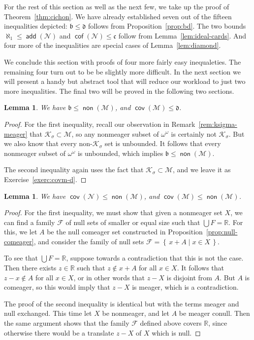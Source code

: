 \documentclass[11pt,oneside]{amsbook}
\newcommand{\set}[1]{\left\{\,#1\,\right\}}
\newcommand{\RR}{\mathbb R}
\newcommand{\Null}{\mathcal N}
\newcommand{\Meager}{\mathcal M}
\newcommand{\Ksigma}{\mathcal K_\sigma}
\DeclareMathOperator{\add}{\mathsf{add}}
\DeclareMathOperator{\non}{\mathsf{non}}
\DeclareMathOperator{\cov}{\mathsf{cov}}
\DeclareMathOperator{\cof}{\mathsf{cof}}
\theoremstyle{definition}
\theoremstyle{plain}
\newtheorem{lem}[thm]{Lemma}
\theoremstyle{definition}
\theoremstyle{remark}
\begin{document}
For the rest of this section as well as the next few, we take up the proof of Theorem~\ref{thm:cichon}. We have already established seven out of the fifteen inequalities depicted: $\mathfrak b\leq\mathfrak d$ follows from Proposition~\ref{prop:bd}. The two bounds $\aleph_1\leq\add(\Null)$ and $\cof(\Null)\leq\mathfrak c$ follow from Lemma~\ref{lem:ideal-cards}. And four more of the inequalities are special cases of Lemma~\ref{lem:diamond}.

We conclude this section with proofs of four more fairly easy inequaleties. The remaining four turn out to be be slightly more difficult. In the next section we will present a handy but abstract tool that will reduce our workload to just two more inequalities. The final two will be proved in the following two sections.

\begin{lem}
  \label{lem:b-nonm}
  We have $\mathfrak b\leq\non(\Meager)$, and $\cov(\Meager)\leq\mathfrak d$.
\end{lem}

\begin{proof}
  For the first inequality, recall our observation in Remark~\ref{rem:ksigma-meager} that $\Ksigma\subset\Meager$, so any nonmeager subset of $\omega^\omega$ is certainly not $\Ksigma$. But we also know that every non-$\Ksigma$ set is unbounded. It follows that every nonmeager subset of $\omega^\omega$ is unbounded, which implies $\mathfrak b\leq\non(\Meager)$.

  The second inequality again uses the fact that $\Ksigma\subset\Meager$, and we leave it as Exercise~\ref{exerc:covm-d}.
\end{proof}

\begin{lem}
  \label{lem:covn-nonm}
  We have $\cov(\Null)\leq\non(\Meager)$, and $\cov(\Meager)\leq\non(\Meager)$.
\end{lem}

\begin{proof}
  For the first inequality, we must show that given a nonmeager set $X$, we can find a family $\mathcal F$ of null sets of smaller or equal size such that $\bigcup F=\RR$. For this, we let $A$ be the null comeager set constructed in Proposition~\ref{prop:null-comeager}, and consider the family of null sets $\mathcal F=\set{x+A\mid x\in X}$.

  To see that $\bigcup F=\RR$, suppose towards a contradiction that this is not the case. Then there exists $z\in\RR$ such that $z\notin x+A$ for all $x\in X$. It follows that $z-x\notin A$ for all $x\in X$, or in other words that $z-X$ is disjoint from $A$. But $A$ is comeager, so this would imply that $z-X$ is meager, which is a contradiction.

  The proof of the second inequality is identical but with the terms meager and null exchanged. This time let $X$ be nonmeager, and let $A$ be meager conull. Then the same argument shows that the family $\mathcal F$ defined above covers $\RR$, since otherwise there would be a translate $z-X$ of $X$ which is null.
\end{proof}
\end{document}

